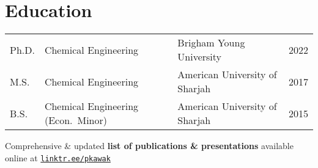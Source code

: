\documentclass[letterpaper,12pt]{article}
\begin{document}
\section*{Education}%
\begin{tabular}{@{}p{} p{} p{} r@{}}
  Ph.D.   & Chemical Engineering        & Brigham Young University       & 2022 \\ %
  M.S.    &  Chemical Engineering       & American University of Sharjah & 2017 \\ %
  B.S.    & Chemical Engineering (Econ.~Minor) & American University of Sharjah & 2015 \\ %
\end{tabular}

\vspace{1.0\baselineskip}
\begin{center}
  \begin{footnotesize}
    Comprehensive \& updated \textbf{list of publications \& presentations} available online at \href{https://linktr.ee/pkawak}{\tt linktr.ee/pkawak}\\
  \end{footnotesize}
\end{center}
\end{document}
